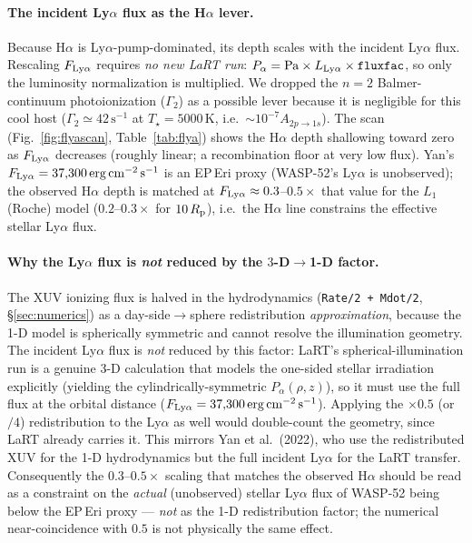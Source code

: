 \documentclass[english,a4paper]{kiseon_memo}
\newcommand{\Rp}{R_{\rm p}}
\begin{document}
\paragraph{The incident Ly$\alpha$ flux as the H$\alpha$ lever.}
Because H$\alpha$ is Ly$\alpha$-pump-dominated, its depth scales with the incident
Ly$\alpha$ flux.  Rescaling $F_{\rm Ly\alpha}$ requires \emph{no new LaRT run}:
$P_\alpha=\mathrm{Pa}\times L_{\rm Ly\alpha}\times\texttt{fluxfac}$, so only the
luminosity normalization is multiplied.  We dropped the $n=2$ Balmer-continuum
photoionization ($\Gamma_2$) as a possible lever because it is negligible for this
cool host ($\Gamma_2\simeq42\,\mathrm{s^{-1}}$ at $T_\star=5000$\,K, i.e.\
$\sim10^{-7}A_{2p\to1s}$).  The scan (Fig.~\ref{fig:flyascan}, Table~\ref{tab:flya})
shows the H$\alpha$ depth shallowing toward zero as $F_{\rm Ly\alpha}$ decreases
(roughly linear; a recombination floor at very low flux).  Yan's $F_{\rm Ly\alpha}=37{,}300\,\mathrm{erg\,cm^{-2}\,s^{-1}}$
is an EP\,Eri proxy (WASP-52's Ly$\alpha$ is unobserved); the observed H$\alpha$
depth is matched at $F_{\rm Ly\alpha}\approx0.3$--$0.5\times$ that value for the
$L_1$ (Roche) model ($0.2$--$0.3\times$ for $10\,\Rp$), i.e.\ the H$\alpha$ line
constrains the effective stellar Ly$\alpha$ flux.

\paragraph{Why the Ly$\alpha$ flux is \emph{not} reduced by the $3$-D$\to$1-D
factor.}
The XUV ionizing flux is halved in the hydrodynamics (\texttt{Rate/2 + Mdot/2},
\S\ref{sec:numerics}) as a day-side$\to$sphere redistribution \emph{approximation},
because the 1-D model is spherically symmetric and cannot resolve the illumination
geometry.  The incident Ly$\alpha$ flux is \emph{not} reduced by this factor: LaRT's
spherical-illumination run is a genuine 3-D calculation that models the one-sided
stellar irradiation explicitly (yielding the cylindrically-symmetric
$P_\alpha(\rho,z)$), so it must use the full flux at the orbital distance
($F_{\rm Ly\alpha}=37{,}300\,\mathrm{erg\,cm^{-2}\,s^{-1}}$).  Applying the $\times0.5$
(or $/4$) redistribution to the Ly$\alpha$ as well would double-count the geometry,
since LaRT already carries it.  This mirrors Yan et al.\ (2022), who use the
redistributed XUV for the 1-D hydrodynamics but the full incident Ly$\alpha$ for the
LaRT transfer.  Consequently the $0.3$--$0.5\times$ scaling that matches the observed
H$\alpha$ should be read as a constraint on the \emph{actual} (unobserved) stellar
Ly$\alpha$ flux of WASP-52 being below the EP\,Eri proxy --- \emph{not} as the 1-D
redistribution factor; the numerical near-coincidence with $0.5$ is not physically
the same effect.
\end{document}

